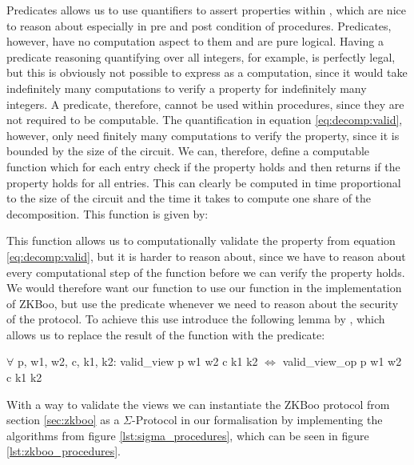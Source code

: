 Predicates allows us to use quantifiers to assert properties within \easycrypt , which are nice to
reason about especially in pre and post condition of procedures. Predicates,
however, have no computation aspect to them and are pure logical.
Having a predicate reasoning quantifying over all integers, for example, is
perfectly legal, but this is obviously not possible to express as a computation,
since it would take indefinitely many computations to verify a property for
indefinitely many integers.
A predicate, therefore, cannot be used within procedures, since they are not
required to be computable.
The quantification in equation \ref{eq:decomp:valid}, however, only need
finitely many computations to verify the property, since it is bounded by the
size of the circuit. We can, therefore, define a computable function which for
each entry check if the property holds and then returns if the property holds
for all entries. This can clearly be computed in time proportional to the size
of the circuit and the time it takes to compute one share of the decomposition.
This function is given by:


This function allows us to computationally validate the property from equation
\ref{eq:decomp:valid}, but it is harder to reason about, since we have
to reason about every computational step of the function before we can verify
the property holds. We would therefore want our function to use our function in
the implementation of ZKBoo, but use the predicate whenever we need to reason
about the security of the protocol.
To achieve this use introduce the following lemma by \citet{Yao},
which allows us to replace the result of the function with the predicate:
\begin{lemma}
  $\forall$ p, w1, w2, c, k1, k2:
  valid\_view p w1 w2 c k1 k2 $\iff$ valid\_view\_op p w1 w2 c k1 k2
\end{lemma}

With a way to validate the views we can instantiate the ZKBoo protocol from
section \ref{sec:zkboo} as a $\Sigma$-Protocol in our formalisation by
implementing the algorithms from figure \ref{lst:sigma_procedures}, which can be
seen in figure \ref{lst:zkboo_procedures}.

